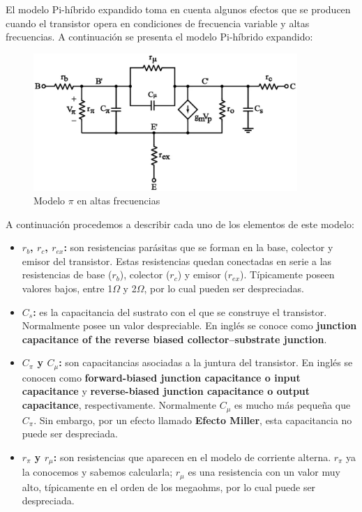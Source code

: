 El modelo Pi-híbrido expandido toma en cuenta algunos efectos que se producen cuando el transistor opera en condiciones de frecuencia variable y altas frecuencias. A continuación se presenta el modelo Pi-híbrido expandido:

\begin{figure}[H]
    \centering
    \includegraphics[width=10cm]{Imagenes/modelo pi wh.jpg}
    \caption{Modelo $\pi$ en altas frecuencias}
    \label{fig:modelo_pi_2}
\end{figure}

A continuación procedemos a describir cada uno de los elementos de este modelo:

\begin{itemize}
    \item \textbf{$r_b$, $r_c$, $r_{ex}$:} son resistencias parásitas que se forman en la base, colector y emisor del transistor. Estas resistencias quedan conectadas en serie a las resistencias de base (\textbf{$r_b$}), colector (\textbf{$r_c$}) y emisor (\textbf{$r_{ex}$}). Típicamente poseen valores bajos, entre 1$\Omega$ y 2$\Omega$, por lo cual pueden ser despreciadas.
    \item\textbf{$C_s$:} es la capacitancia del sustrato con el que se construye el transistor. Normalmente posee un valor despreciable. En inglés se conoce como \textbf{junction capacitance of the reverse biased collector–substrate junction}.
    \item\textbf{$C_{\pi}$ y $C_{\mu}$:} son capacitancias asociadas a la juntura del transistor. En inglés se conocen como \textbf{forward-biased junction capacitance o input capacitance} y \textbf{reverse-biased junction capacitance o output capacitance}, respectivamente. Normalmente $C_{\mu}$ es mucho más pequeña que $C_{\pi}$. Sin embargo, por un efecto llamado \textbf{Efecto Miller}, esta capacitancia no puede ser despreciada.

    \item \textbf{$r_\pi$ y $r_{\mu}$:} son resistencias que aparecen en el modelo de corriente alterna. \textbf{$r_{\pi}$} ya la conocemos y sabemos calcularla; \textbf{$r_{\mu}$} es una resistencia con un valor muy alto, típicamente en el orden de los megaohms, por lo cual puede ser despreciada.
\end{itemize}

